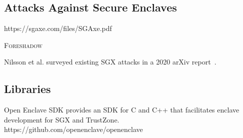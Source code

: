 \subsection{Attacks Against Secure Enclaves}

https://sgaxe.com/files/SGAxe.pdf

\textsc{Foreshadow}~\cite{Bulck18a}
\cite{Bulck19a}


Nilsson et al. surveyed existing SGX attacks in a 2020 arXiv report~\cite{Nilsson20a}.

\subsection{Libraries}

Open Enclave SDK provides an SDK for C and C++ that facilitates enclave development for SGX and TrustZone.
https://github.com/openenclave/openenclave
